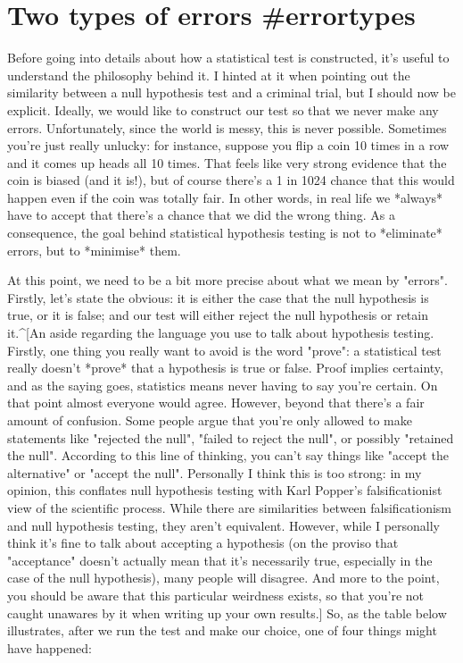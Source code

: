 \section{Two types of errors {#errortypes}}

Before going into details about how a statistical test is constructed, it's useful to understand the philosophy behind it. I hinted at it when pointing out the similarity between a null hypothesis test and a criminal trial, but I should now be explicit. Ideally, we would like to construct our test so that we never make any errors. Unfortunately, since the world is messy, this is never possible. Sometimes you're just really unlucky: for instance, suppose you flip a coin 10 times in a row and it comes up heads all 10 times. That feels like very strong evidence that the coin is biased (and it is!), but of course there's a 1 in 1024 chance that this would happen even if the coin was totally fair. In other words, in real life we *always* have to accept that there's a chance that we did the wrong thing. As a consequence, the goal behind statistical hypothesis testing is not to *eliminate* errors, but to *minimise* them.

At this point, we need to be a bit more precise about what we mean by "errors". Firstly,  let's state the obvious: it is either the case that the null hypothesis is true, or it is false; and our test will either reject the null hypothesis or retain it.^[An aside regarding the language you use to talk about hypothesis testing. Firstly, one thing you really want to avoid is the word "prove": a statistical test really doesn't *prove* that a hypothesis is true or false. Proof implies certainty, and as the saying goes, statistics means never having to say you're certain. On that point almost everyone would agree. However, beyond that there's a fair amount of confusion. Some people argue that you're only allowed to make statements like "rejected the null", "failed to reject the null", or possibly "retained the null". According to this line of thinking, you can't say things like "accept the alternative" or "accept the null". Personally I think this is too strong: in my opinion, this conflates null hypothesis testing with Karl Popper's falsificationist view of the scientific process. While there are similarities between falsificationism and null hypothesis testing, they aren't equivalent. However, while I personally think it's fine to talk about accepting a hypothesis (on the proviso that "acceptance" doesn't actually mean that it's necessarily true, especially in the case of the null hypothesis), many people will disagree. And more to the point, you should be aware that this particular weirdness exists, so that you're not caught unawares by it when writing up your own results.] So, as the table below illustrates, after we run the test and make our choice, one of four things might have happened:

